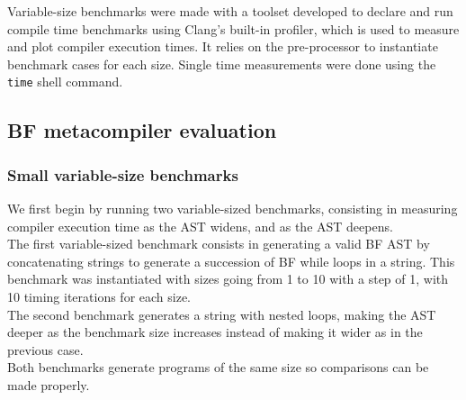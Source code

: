 \documentclass[../../main.tex]{subfiles}
\begin{document}
Variable-size benchmarks were made with a toolset developed to declare and run
compile time benchmarks using Clang's built-in profiler, which is used to
measure and plot compiler execution times. It relies on the \cpp pre-processor to
instantiate benchmark cases for each size.
Single time measurements were done using the \lstinline|time| shell command.

\subsection{BF metacompiler evaluation}

\subsubsection{Small variable-size benchmarks}

We first begin by running two variable-sized benchmarks, consisting in
measuring compiler execution time as the AST widens, and as the AST deepens.\\

The first variable-sized benchmark consists in generating a valid BF AST by
concatenating strings to generate a succession of BF while loops in a
\constexpr string. This benchmark was instantiated with sizes going from 1 to
10 with a step of 1, with 10 timing iterations for each size.\\

The second benchmark generates a string with
nested loops, making the AST deeper as the benchmark size increases instead
of making it wider as in the previous case.\\

Both benchmarks generate programs of the same size so comparisons can be made
properly.
\end{document}
